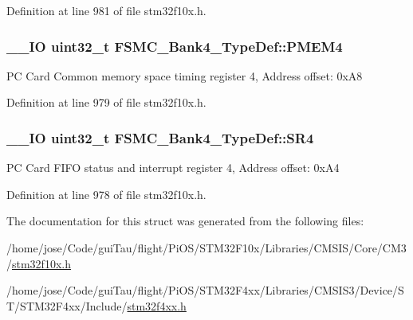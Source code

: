 Definition at line 981 of file stm32f10x.\-h.

\hypertarget{struct_f_s_m_c___bank4___type_def_a4ed4ce751e7a8b3207bd20675b1d9085}{
\subsubsection[{P\-M\-E\-M4}]{\setlength{\rightskip}{0pt plus 5cm}\-\_\-\-\_\-\-I\-O {\bf uint32\-\_\-t} F\-S\-M\-C\-\_\-\-Bank4\-\_\-\-Type\-Def\-::\-P\-M\-E\-M4}}\label{struct_f_s_m_c___bank4___type_def_a4ed4ce751e7a8b3207bd20675b1d9085}
P\-C Card Common memory space timing register 4, Address offset\-: 0x\-A8 

Definition at line 979 of file stm32f10x.\-h.

\hypertarget{struct_f_s_m_c___bank4___type_def_a1e0f09be7fa48bb7b14233866da1dd9f}{
\subsubsection[{S\-R4}]{\setlength{\rightskip}{0pt plus 5cm}\-\_\-\-\_\-\-I\-O {\bf uint32\-\_\-t} F\-S\-M\-C\-\_\-\-Bank4\-\_\-\-Type\-Def\-::\-S\-R4}}\label{struct_f_s_m_c___bank4___type_def_a1e0f09be7fa48bb7b14233866da1dd9f}
P\-C Card F\-I\-F\-O status and interrupt register 4, Address offset\-: 0x\-A4 

Definition at line 978 of file stm32f10x.\-h.



The documentation for this struct was generated from the following files\-:\begin{DoxyCompactItemize}
\item 
/home/jose/\-Code/gui\-Tau/flight/\-Pi\-O\-S/\-S\-T\-M32\-F10x/\-Libraries/\-C\-M\-S\-I\-S/\-Core/\-C\-M3/\hyperlink{stm32f10x_8h}{stm32f10x.\-h}\item 
/home/jose/\-Code/gui\-Tau/flight/\-Pi\-O\-S/\-S\-T\-M32\-F4xx/\-Libraries/\-C\-M\-S\-I\-S3/\-Device/\-S\-T/\-S\-T\-M32\-F4xx/\-Include/\hyperlink{stm32f4xx_8h}{stm32f4xx.\-h}\end{DoxyCompactItemize}
